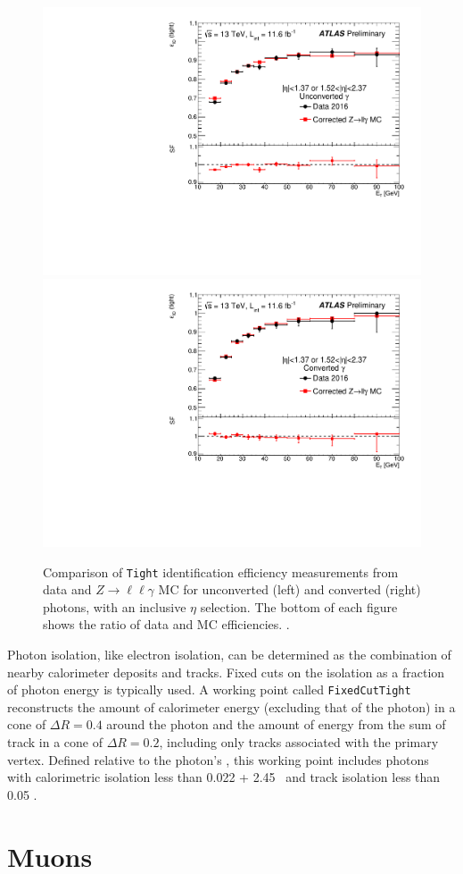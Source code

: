 \begin{centering}
\begin{figure}[!hbt]
\myfloatalign
\includegraphics[width=.48\linewidth]{figures/reco/photon_fig_01.pdf}
\includegraphics[width=.48\linewidth]{figures/reco/photon_fig_02.pdf}
\caption{ Comparison of \texttt{Tight} identification efficiency measurements from data and $Z\rightarrow \ell\ell\gamma$ \ac{MC} for unconverted (left) and converted (right) photons, with an inclusive $\eta$ selection. The bottom of each figure shows the ratio of data and \ac{MC} efficiencies. \cite{EGAM-2016-003}.}
\label{fig:reco_photon_eff}
\end{figure}
\end{centering}

Photon isolation, like electron isolation, can be determined as the combination of nearby calorimeter deposits and tracks. Fixed cuts on the isolation as a fraction of photon energy is typically used. A working point called \texttt{FixedCutTight} reconstructs the amount of calorimeter energy (excluding that of the photon) in a cone of $\Delta R  = 0.4$ around the photon and the amount of energy from the sum of track \pt in a cone of $\Delta R = 0.2$, including only tracks associated with the primary vertex. Defined relative to the photon's \pt, this working point includes photons with calorimetric isolation less than 0.022 \pt + 2.45 \gev~and track isolation less than 0.05 \pt \cite{isolation}. 

\section{Muons}
\label{sec:reco_muons}

